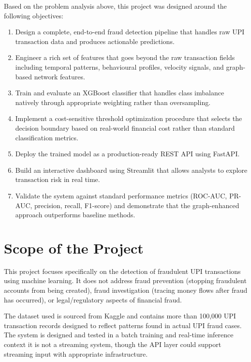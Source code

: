 Based on the problem analysis above, this project was designed around the following objectives:

\begin{enumerate}
    \item Design a complete, end-to-end fraud detection pipeline that handles raw UPI transaction data and produces actionable predictions.
    \item Engineer a rich set of features that goes beyond the raw transaction fields including temporal patterns, behavioural profiles, velocity signals, and graph-based network features.
    \item Train and evaluate an XGBoost classifier that handles class imbalance natively through appropriate weighting rather than oversampling.
    \item Implement a cost-sensitive threshold optimization procedure that selects the decision boundary based on real-world financial cost rather than standard classification metrics.
    \item Deploy the trained model as a production-ready REST API using FastAPI.
    \item Build an interactive dashboard using Streamlit that allows analysts to explore transaction risk in real time.
    \item Validate the system against standard performance metrics (ROC-AUC, PR-AUC, precision, recall, F1-score) and demonstrate that the graph-enhanced approach outperforms baseline methods.
\end{enumerate}

\section{Scope of the Project}

This project focuses specifically on the detection of fraudulent UPI transactions using machine learning. It does not address fraud prevention (stopping fraudulent accounts from being created), fraud investigation (tracing money flows after fraud has occurred), or legal/regulatory aspects of financial fraud.

The dataset used is sourced from Kaggle and contains more than 100,000  UPI transaction records designed to reflect patterns found in actual UPI fraud cases. The system is designed and tested in a batch training and real-time inference context it is not a streaming system, though the API layer could support streaming input with appropriate infrastructure.

